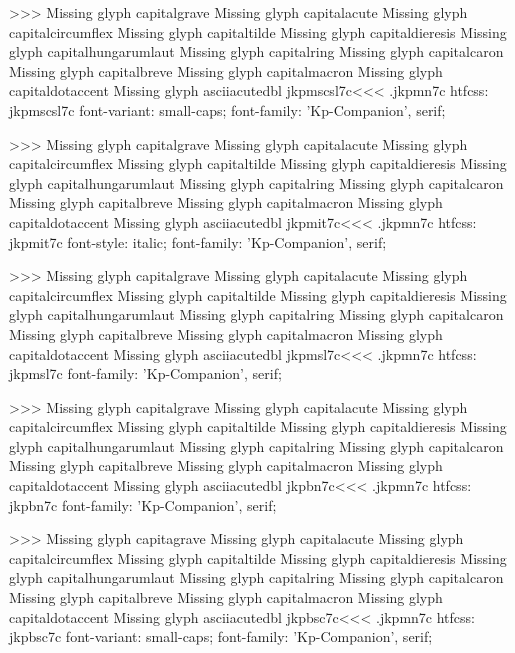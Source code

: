 >>>
Missing glyph	capitalgrave
Missing glyph	capitalacute
Missing glyph	capitalcircumflex
Missing glyph	capitaltilde
Missing glyph	capitaldieresis
Missing glyph	capitalhungarumlaut
Missing glyph	capitalring
Missing glyph	capitalcaron
Missing glyph	capitalbreve
Missing glyph	capitalmacron
Missing glyph	capitaldotaccent
Missing glyph	asciiacutedbl
\<jkpmscsl7c\><<<
.jkpmn7c
htfcss:  jkpmscsl7c  font-variant: small-caps; font-family: 'Kp-Companion', serif;

>>>
Missing glyph	capitalgrave
Missing glyph	capitalacute
Missing glyph	capitalcircumflex
Missing glyph	capitaltilde
Missing glyph	capitaldieresis
Missing glyph	capitalhungarumlaut
Missing glyph	capitalring
Missing glyph	capitalcaron
Missing glyph	capitalbreve
Missing glyph	capitalmacron
Missing glyph	capitaldotaccent
Missing glyph	asciiacutedbl
\<jkpmit7c\><<<
.jkpmn7c
htfcss:  jkpmit7c  font-style: italic; font-family: 'Kp-Companion', serif;

>>>
Missing glyph	capitalgrave
Missing glyph	capitalacute
Missing glyph	capitalcircumflex
Missing glyph	capitaltilde
Missing glyph	capitaldieresis
Missing glyph	capitalhungarumlaut
Missing glyph	capitalring
Missing glyph	capitalcaron
Missing glyph	capitalbreve
Missing glyph	capitalmacron
Missing glyph	capitaldotaccent
Missing glyph	asciiacutedbl
\<jkpmsl7c\><<<
.jkpmn7c
htfcss:  jkpmsl7c  font-family: 'Kp-Companion', serif;

>>>
Missing glyph	capitalgrave
Missing glyph	capitalacute
Missing glyph	capitalcircumflex
Missing glyph	capitaltilde
Missing glyph	capitaldieresis
Missing glyph	capitalhungarumlaut
Missing glyph	capitalring
Missing glyph	capitalcaron
Missing glyph	capitalbreve
Missing glyph	capitalmacron
Missing glyph	capitaldotaccent
Missing glyph	asciiacutedbl
\<jkpbn7c\><<<
.jkpmn7c
htfcss:  jkpbn7c  font-family: 'Kp-Companion', serif;

>>>
Missing glyph	capitagrave
Missing glyph	capitalacute
Missing glyph	capitalcircumflex
Missing glyph	capitaltilde
Missing glyph	capitaldieresis
Missing glyph	capitalhungarumlaut
Missing glyph	capitalring
Missing glyph	capitalcaron
Missing glyph	capitalbreve
Missing glyph	capitalmacron
Missing glyph	capitaldotaccent
Missing glyph	asciiacutedbl
\<jkpbsc7c\><<<
.jkpmn7c
htfcss:  jkpbsc7c  font-variant: small-caps; font-family: 'Kp-Companion', serif;

